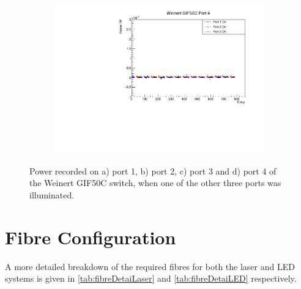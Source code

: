 \documentclass[a4paper,11pt]{article}
\begin{document}
\begin{figure}[h!]
\begin{subfigure}{0.5\textwidth}
\subcaption{}\label{fig:weingifcrosstalkport3}
\end{subfigure}%
\begin{subfigure}{0.5\textwidth}
\includegraphics[width=\linewidth]{WeinertGIF50CPort4.pdf}
\subcaption{}\label{fig:weingifcrosstalkport4}
\end{subfigure}
\caption{Power recorded on a) port 1, b) port 2, c) port 3 and d) port 4 of the Weinert GIF50C switch, when one of the other three ports was illuminated.}\label{fig:weingifcrosstalk2}
\end{figure}

\clearpage
\newpage

\section{Fibre Configuration}\label{app:fibreconfig}

A more detailed breakdown of the required fibres for both the laser and LED systems is given in \cref{tab:fibreDetaiLaser} and \cref{tab:fibreDetaiLED} respectively.
\end{document}
